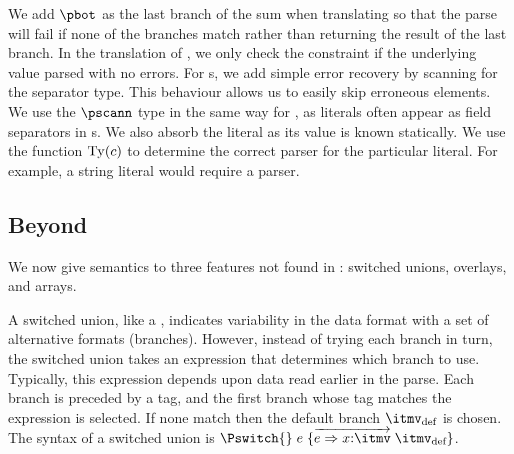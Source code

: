   We add $\pbot$ as the
last branch of the \ddc{} sum when translating \Punion{} so that the
parse will fail if none of the branches match rather than returning
the result of the last branch.    In the translation of
\Pwhere{}, we only check the constraint if the underlying value parsed
with no errors. For \Parray{}s, we add simple error recovery by
scanning for the separator type.  This behaviour allows us to easily
skip erroneous elements. We use the $\pscann$ type in the same way for
, as literals often appear as field separators in
\Pstruct{}s.  We also absorb the literal as its value is known
statically.  We use the function ${\rm Ty}(c)$ to determine the
correct parser for the particular literal. For example, a string
literal would require a \Pstring{} parser.

\subsection{Beyond \ipads{}}

We now give semantics to three features not found in \ipads{}:
\pads{} switched unions, \packettypes{} overlays, and \datascript{} arrays.

A switched union, like a \Punion, indicates variability in the data
format with a set of alternative formats (branches). However, instead
of trying each branch in turn, the switched union takes an expression that
determines which branch to use. Typically, this expression depends upon data read earlier in the parse. Each branch is preceded by a tag,
and the first branch whose tag matches the expression is selected.
If none match then the default branch $\itmv_{\text{def}}$ is chosen.
The syntax of a switched union is $\Pswitch{}\;e\;\{\overrightarrow{e
  \Rightarrow x{:}\itmv}\; \itmv_{\text{def}}\}$.

